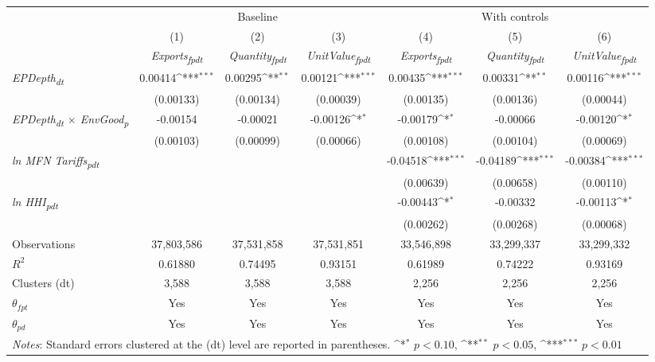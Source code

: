 {
\def\sym#1{\ifmmode^{#1}\else\(^{#1}\)\fi}
\begin{tabular}{l*{6}{c}}
\toprule
&\multicolumn{3}{c}{Baseline}&\multicolumn{3}{c}{With controls}\\\cmidrule(lr){2-4}\cmidrule(lr){5-7}
&(1)&(2)&(3)&(4)&(5)&(6)\\
&\textit{Exports\textsubscript{fpdt}}&\textit{Quantity\textsubscript{fpdt}}&\textit{UnitValue\textsubscript{fpdt}}&\textit{Exports\textsubscript{fpdt}}&\textit{Quantity\textsubscript{fpdt}}&\textit{UnitValue\textsubscript{fpdt}}\\
\midrule
\textit{EPDepth\textsubscript{dt}} & 0.00414\sym{***} & 0.00295\sym{**} & 0.00121\sym{***} & 0.00435\sym{***} & 0.00331\sym{**} & 0.00116\sym{***}\\
 & (0.00133) & (0.00134) & (0.00039) & (0.00135) & (0.00136) & (0.00044)\\
\addlinespace
\textit{EPDepth\textsubscript{dt} $\times$ EnvGood\textsubscript{p}} & -0.00154 & -0.00021 & -0.00126\sym{*} & -0.00179\sym{*} & -0.00066 & -0.00120\sym{*}\\
 & (0.00103) & (0.00099) & (0.00066) & (0.00108) & (0.00104) & (0.00069)\\
\addlinespace
\textit{ln MFN Tariffs\textsubscript{pdt}} &  &  &  & -0.04518\sym{***} & -0.04189\sym{***} & -0.00384\sym{***}\\
 &  &  &  & (0.00639) & (0.00658) & (0.00110)\\
\addlinespace
\textit{ln HHI\textsubscript{pdt}} &  &  &  & -0.00443\sym{*} & -0.00332 & -0.00113\sym{*}\\
 &  &  &  & (0.00262) & (0.00268) & (0.00068)\\
\midrule
Observations & 37,803,586 & 37,531,858 & 37,531,851 & 33,546,898 & 33,299,337 & 33,299,332\\
$R^{2}$ & 0.61880 & 0.74495 & 0.93151 & 0.61989 & 0.74222 & 0.93169\\
Clusters (dt) & 3,588 & 3,588 & 3,588 & 2,256 & 2,256 & 2,256\\
$\theta_{fpt}$ & Yes & Yes & Yes & Yes & Yes & Yes\\
$\theta_{pd}$ & Yes & Yes & Yes & Yes & Yes & Yes\\
\bottomrule
\multicolumn{7}{l}{\footnotesize \textit{Notes}: Standard errors clustered at the (dt) level are reported in parentheses. \sym{*} \(p<0.10\), \sym{**} \(p<0.05\), \sym{***} \(p<0.01\)}\\
\end{tabular}
}
